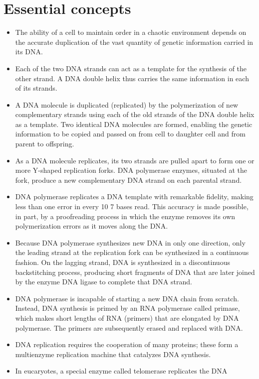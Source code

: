 \section{Essential concepts}

\begin{itemize}
\item The ability of a cell to maintain order in a chaotic environment
depends on the accurate duplication of the vast quantity of genetic
information carried in its DNA.
\item Each of the two DNA strands can act as a template for the synthesis
of the other strand. A DNA double helix thus carries the same information
in each of its strands.
\item A DNA molecule is duplicated (replicated) by the polymerization of
new complementary strands using each of the old strands of the DNA
double helix as a template. Two identical DNA molecules are formed,
enabling the genetic information to be copied and passed on from
cell to daughter cell and from parent to offspring.
\item As a DNA molecule replicates, its two strands are pulled apart to form
one or more Y-shaped replication forks. DNA polymerase enzymes,
situated at the fork, produce a new complementary DNA strand on
each parental strand.
\item DNA polymerase replicates a DNA template with remarkable fidelity,
making less than one error in every 10 7 bases read. This accuracy
is made possible, in part, by a proofreading process in which the
enzyme removes its own polymerization errors as it moves along the
DNA.
\item Because DNA polymerase synthesizes new DNA in only one direction,
only the leading strand at the replication fork can be synthesized in
a continuous fashion. On the lagging strand, DNA is synthesized in
a discontinuous backstitching process, producing short fragments of
DNA that are later joined by the enzyme DNA ligase to complete that
DNA strand.
\item DNA polymerase is incapable of starting a new DNA chain from
scratch. Instead, DNA synthesis is primed by an RNA polymerase
called primase, which makes short lengths of RNA (primers) that are
elongated by DNA polymerase. The primers are subsequently erased
and replaced with DNA.
\item DNA replication requires the cooperation of many proteins; these form
a multienzyme replication machine that catalyzes DNA synthesis.
\item In eucaryotes, a special enzyme called telomerase replicates the DNA

\end{itemize}
